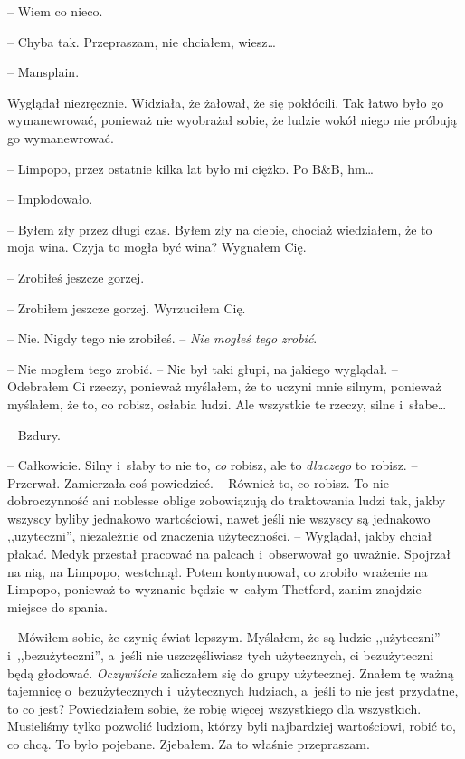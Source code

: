 \documentclass[oneside,polish,11pt,sfheadings]{mwbk}
\begin{document}
-- Wiem co nieco.

-- Chyba tak. Przepraszam, nie chciałem, wiesz\ldots 

-- Mansplain.

Wyglądał niezręcznie. Widziała, że żałował, że się pokłócili. Tak łatwo
było go wymanewrować, ponieważ nie wyobrażał sobie, że ludzie wokół
niego nie próbują go wymanewrować.

-- Limpopo, przez ostatnie kilka lat było mi ciężko. Po B\&B, hm\ldots 

-- Implodowało.

-- Byłem zły przez długi czas. Byłem zły na ciebie, chociaż wiedziałem,
że to moja wina. Czyja to mogła być wina? Wygnałem Cię.

-- Zrobiłeś jeszcze gorzej.

-- Zrobiłem jeszcze gorzej. Wyrzuciłem Cię.

-- Nie. Nigdy tego nie zrobiłeś. -- \textit{Nie mogłeś tego zrobić}.

-- Nie mogłem tego zrobić. -- Nie był taki głupi, na jakiego wyglądał. -- Odebrałem Ci rzeczy, ponieważ myślałem, że to uczyni mnie silnym,
ponieważ myślałem, że to, co robisz, osłabia ludzi. Ale wszystkie te
rzeczy, silne i~słabe\ldots 

-- Bzdury.

-- Całkowicie. Silny i~słaby to nie to, \textit{co} robisz, ale to
\textit{dlaczego} to robisz. -- Przerwał. Zamierzała coś powiedzieć. -- Również to, co robisz. To nie dobroczynność ani noblesse oblige
zobowiązują do traktowania ludzi tak, jakby wszyscy byliby jednakowo
wartościowi, nawet jeśli nie wszyscy są jednakowo ,,użyteczni'',
niezależnie od znaczenia użyteczności. -- Wyglądał, jakby chciał płakać.
Medyk przestał pracować na palcach i~obserwował go uważnie. Spojrzał na
nią, na Limpopo, westchnął. Potem kontynuował, co zrobiło wrażenie na
Limpopo, ponieważ to wyznanie będzie w~całym Thetford, zanim znajdzie
miejsce do spania.

-- Mówiłem sobie, że czynię świat lepszym. Myślałem, że są ludzie
,,użyteczni'' i~,,bezużyteczni'', a~jeśli nie uszczęśliwiasz tych
użytecznych, ci bezużyteczni będą głodować. \textit{Oczywiście} zaliczałem
się do grupy użytecznej. Znałem tę ważną tajemnicę o~bezużytecznych i~użytecznych ludziach, a~jeśli to nie jest przydatne, to co jest?
Powiedziałem sobie, że robię więcej wszystkiego dla wszystkich.
Musieliśmy tylko pozwolić ludziom, którzy byli najbardziej wartościowi,
robić to, co chcą. To było pojebane. Zjebałem. Za to właśnie
przepraszam.
\end{document}
